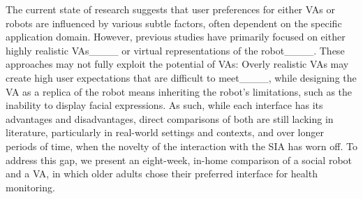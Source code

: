 The current state of research suggests that user preferences for either \acp{VA} or robots are influenced by various subtle factors, often dependent on the specific application domain. 
However, previous studies have primarily focused on either highly realistic \acp{VA}____ or virtual representations of the robot____. 
These approaches may not fully exploit the potential of \acp{VA}: 
Overly realistic \acp{VA} may create high user expectations that are difficult to meet____, while designing the \ac{VA} as a replica of the robot means inheriting the robot's limitations, such as the inability to display facial expressions.
As such, while each interface has its advantages and disadvantages, direct comparisons of both are still lacking in literature, particularly in real-world settings and contexts, and over longer periods of time, when the novelty of the interaction with the \ac{SIA} has worn off. 
To address this gap, we present an eight-week, in-home comparison of a social robot and a \ac{VA}, in which older adults chose their preferred interface for health monitoring.
%